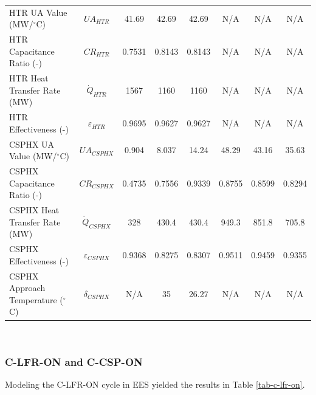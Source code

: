 \begin{paracol}{2}
\begin{specialtable}[H]
\begin{tabular}{lccccccc}
    HTR UA Value (MW/$^{\circ}$C)	&	$UA_{HTR}$	&	41.69	&	42.69	&	42.69	&	N/A	&	N/A	&	N/A	\\
    HTR Capacitance Ratio (-)	&	$CR_{HTR}$	&	0.7531	&	0.8143	&	0.8143	&	N/A	&	N/A	&	N/A	\\
    HTR Heat Transfer Rate (MW)	&	$\dot{Q}_{HTR}$	&	1567	&	1160	&	1160	&	N/A	&	N/A	&	N/A	\\
    HTR Effectiveness (-)	&	$\varepsilon_{HTR}$	&	0.9695	&	0.9627	&	0.9627	&	N/A	&	N/A	&	N/A	\\
    CSPHX UA Value (MW/$^{\circ}$C)	&	$UA_{CSPHX}$	&	0.904	&	8.037	&	14.24	&	48.29	&	43.16	&	35.63	\\
    CSPHX Capacitance Ratio (-)	&	$CR_{CSPHX}$	&	0.4735	&	0.7556	&	0.9339	&	0.8755	&	0.8599	&	0.8294	\\
    CSPHX Heat Transfer Rate (MW)	&	$\dot{Q}_{CSPHX}$	&	328	&	430.4	&	430.4	&	949.3	&	851.8	&	705.8	\\
    CSPHX Effectiveness (-)	&	$\varepsilon_{CSPHX}$	&	0.9368	&	0.8275	&	0.8307	&	0.9511	&	0.9459	&	0.9355	\\
    CSPHX Approach Temperature ($^{\circ}$C)	&	$\delta_{CSPHX}$	&	N/A	&	35	&	26.27	&	N/A	&	N/A	&	N/A	\\
    \bottomrule
    \end{tabular}\\
\end{specialtable}



\subsubsection{C-LFR-ON and C-CSP-ON}

Modeling the C-LFR-ON cycle in EES yielded the results in Table \ref{tab-c-lfr-on}. 


\end{paracol}
